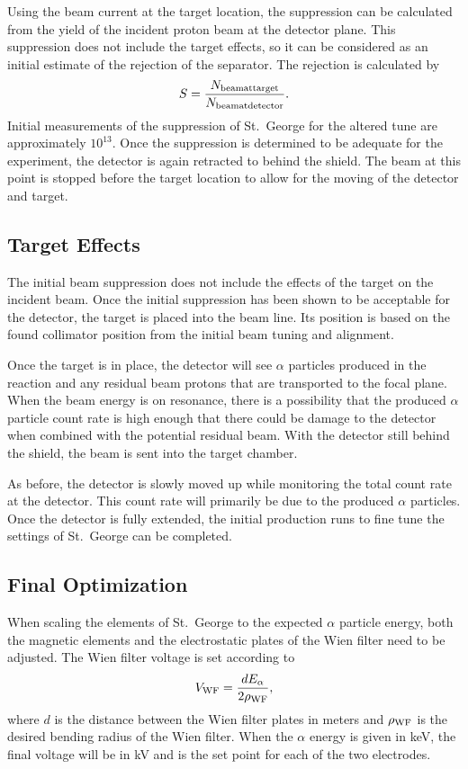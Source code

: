 Using the beam current at the target location, the suppression can be
calculated from the yield of the incident proton beam at the detector
plane. This suppression does not include the target effects, so it can
be considered as an initial estimate of the rejection of the separator.
The rejection is calculated by
\[
    S = \frac{N_{\rm beam at target}}{N_{\rm beam at detector}}.
\]
Initial measurements of the suppression of St.\ George for the altered
tune are approximately $10^{13}$. Once the suppression is determined to
be adequate for the experiment, the detector is again retracted to
behind the shield. The beam at this point is stopped before the target
location to allow for the moving of the detector and target.

\subsection{Target Effects}

The initial beam suppression does not include the effects of the target
on the incident beam. Once the initial suppression has been shown to be
acceptable for the detector, the target is placed into the beam line.
Its position is based on the found collimator position from the initial
beam tuning and alignment.

Once the target is in place, the detector will see $\alpha$ particles
produced in the reaction and any residual beam protons that are
transported to the focal plane. When the beam energy is on resonance,
there is a possibility that the produced $\alpha$ particle count rate is
high enough that there could be damage to the detector when combined
with the potential residual beam. With the detector still behind the
shield, the beam is sent into the target chamber.

As before, the detector is slowly moved up while monitoring the total
count rate at the detector. This count rate will primarily be due to the
produced $\alpha$ particles. Once the detector is fully extended, the
initial production runs to fine tune the settings of St.\ George can be
completed.

\subsection{Final Optimization}

When scaling the elements of St.\ George to the expected $\alpha$
particle energy, both the magnetic elements and the electrostatic plates
of the Wien filter need to be adjusted. The Wien filter voltage is set
according to
\[
    V_{\rm WF} = \frac{d E_{\alpha}}{2 \rho_{\rm WF}},
\]
where $d$ is the distance between the Wien filter plates in meters and
$\rho_{\rm WF}$ is the desired bending radius of the Wien filter. When
the $\alpha$ energy is given in keV, the final voltage will be in kV and
is the set point for each of the two electrodes.

